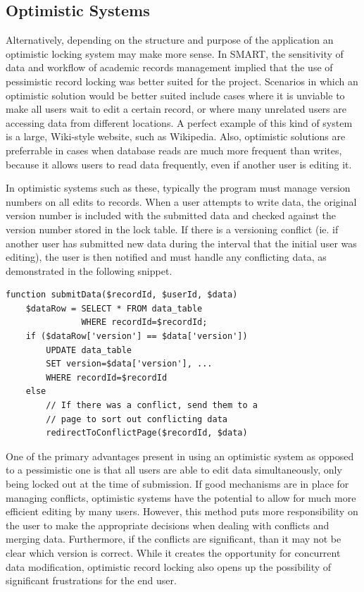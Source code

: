 \documentclass[12pt]{article}
\begin{document}
\newpage
\subsection{Optimistic Systems}
Alternatively, depending on the structure and purpose of the application an optimistic locking system may make more sense. In SMART, the sensitivity of data and workflow of academic records management implied that the use of pessimistic record locking was better suited for the project. Scenarios in which an optimistic solution would be better suited include cases where it is unviable to make all users wait to edit a certain record, or where many unrelated users are accessing data from different locations. A perfect example of this kind of system is a large, Wiki-style website, such as Wikipedia. Also, optimistic solutions are preferrable in cases when database reads are much more frequent than writes, because it allows users to read data frequently, even if another user is editing it. 

In optimistic systems such as these, typically the program must manage version numbers on all edits to records. When a user attempts to write data, the original version number is included with the submitted data and checked against the version number stored in the lock table. If there is a versioning conflict (ie. if another user has submitted new data during the interval that the initial user was editing), the user is then notified and must handle any conflicting data, as demonstrated in the following snippet.

\newpage

\begin{framed}
\begin{spacing}{1.0}
\begin{verbatim}
function submitData($recordId, $userId, $data)
    $dataRow = SELECT * FROM data_table 
               WHERE recordId=$recordId;
    if ($dataRow['version'] == $data['version'])
        UPDATE data_table
        SET version=$data['version'], ...
        WHERE recordId=$recordId
    else
        // If there was a conflict, send them to a
        // page to sort out conflicting data
        redirectToConflictPage($recordId, $data)

\end{verbatim}
\end{spacing}
\end{framed}

One of the primary advantages present in using an optimistic system as opposed to a pessimistic one is that all users are able to edit data simultaneously, only being locked out at the time of submission. If good mechanisms are in place for managing conflicts, optimistic systems have the potential to allow for much more efficient editing by many users. However, this method puts more responsibility on the user to make the appropriate decisions when dealing with conflicts and merging data. Furthermore, if the conflicts are significant, than it may not be clear which version is correct. While it creates the opportunity for concurrent data modification, optimistic record locking also opens up the possibility of significant frustrations for the end user.
\end{document}
